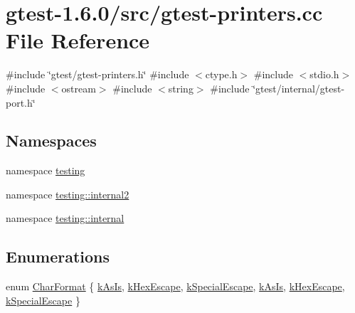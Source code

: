 \hypertarget{gtest-printers_8cc}{\section{gtest-\/1.6.0/src/gtest-\/printers.cc \-File \-Reference}
\label{db/d74/gtest-printers_8cc}
}
{\ttfamily \#include \char`\"{}gtest/gtest-\/printers.\-h\char`\"{}}\*
{\ttfamily \#include $<$ctype.\-h$>$}\*
{\ttfamily \#include $<$stdio.\-h$>$}\*
{\ttfamily \#include $<$ostream$>$}\*
{\ttfamily \#include $<$string$>$}\*
{\ttfamily \#include \char`\"{}gtest/internal/gtest-\/port.\-h\char`\"{}}\*
\subsection*{\-Namespaces}
\begin{DoxyCompactItemize}
\item 
namespace \hyperlink{namespacetesting}{testing}
\item 
namespace \hyperlink{namespacetesting_1_1internal2}{testing\-::internal2}
\item 
namespace \hyperlink{namespacetesting_1_1internal}{testing\-::internal}
\end{DoxyCompactItemize}
\subsection*{\-Enumerations}
\begin{DoxyCompactItemize}
\item 
enum \hyperlink{namespacetesting_1_1internal_a86978cfc154f3443116d1405a5777539}{\-Char\-Format} \{ \*
\hyperlink{namespacetesting_1_1internal_a86978cfc154f3443116d1405a5777539adf6cff2f73fc12c1d8125fa5aa9de2a7}{k\-As\-Is}, 
\hyperlink{namespacetesting_1_1internal_a86978cfc154f3443116d1405a5777539a679e38e7d99974d29e419befbe5c114f}{k\-Hex\-Escape}, 
\hyperlink{namespacetesting_1_1internal_a86978cfc154f3443116d1405a5777539a3b49cdd59f5aca823d8148fdfd55373c}{k\-Special\-Escape}, 
\hyperlink{namespacetesting_1_1internal_a86978cfc154f3443116d1405a5777539adf6cff2f73fc12c1d8125fa5aa9de2a7}{k\-As\-Is}, 
\*
\hyperlink{namespacetesting_1_1internal_a86978cfc154f3443116d1405a5777539a679e38e7d99974d29e419befbe5c114f}{k\-Hex\-Escape}, 
\hyperlink{namespacetesting_1_1internal_a86978cfc154f3443116d1405a5777539a3b49cdd59f5aca823d8148fdfd55373c}{k\-Special\-Escape}
 \}
\end{DoxyCompactItemize}
